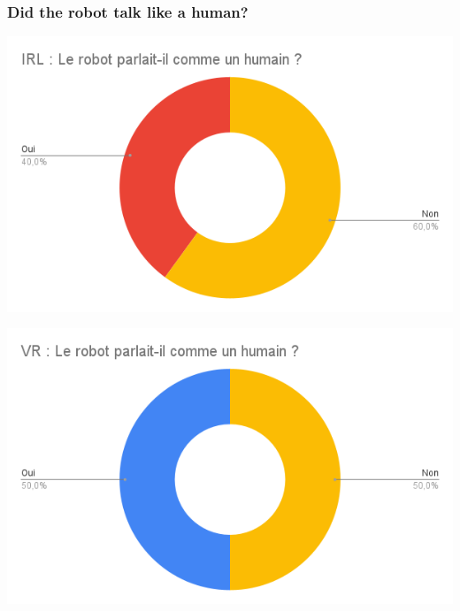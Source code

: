     \subsubsection{Did the robot talk like a human?}
    \begin{minipage}{.5\textwidth}%
    \includegraphics[width=\textwidth]{Datas_childs/IRL _ Le robot parlait-il comme un humain _.png}
    \end{minipage}%
    \begin{minipage}{.5\textwidth}%
    \includegraphics[width=\textwidth]{Datas_childs/VR _ Le robot parlait-il comme un humain _.png}
    \end{minipage}%
    \vspace*{0.5cm}

